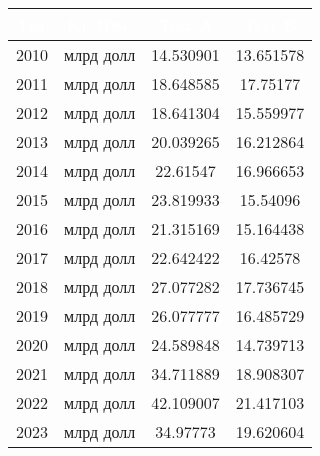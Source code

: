 \begin{tabularx}{\textwidth}{|c|c|c|c|}
    \hline
\rowcolor{black} \textcolor{white}{\textbf{Год}} & \textcolor{white}{\textbf{Ед. Изм.}} & \textcolor{white}{\textbf{Test A}} & \textcolor{white}{\textbf{Test B}} \\ \hline
2010 & млрд долл & 14.530901 & 13.651578 \\ \hline
2011 & млрд долл & 18.648585 & 17.75177 \\ \hline
2012 & млрд долл & 18.641304 & 15.559977 \\ \hline
2013 & млрд долл & 20.039265 & 16.212864 \\ \hline
2014 & млрд долл & 22.61547 & 16.966653 \\ \hline
2015 & млрд долл & 23.819933 & 15.54096 \\ \hline
2016 & млрд долл & 21.315169 & 15.164438 \\ \hline
2017 & млрд долл & 22.642422 & 16.42578 \\ \hline
2018 & млрд долл & 27.077282 & 17.736745 \\ \hline
2019 & млрд долл & 26.077777 & 16.485729 \\ \hline
2020 & млрд долл & 24.589848 & 14.739713 \\ \hline
2021 & млрд долл & 34.711889 & 18.908307 \\ \hline
2022 & млрд долл & 42.109007 & 21.417103 \\ \hline
2023 & млрд долл & 34.97773 & 19.620604 \\ \hline
\end{tabularx}
